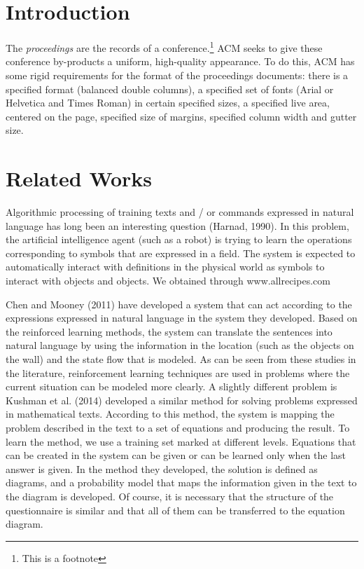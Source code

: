 \section{Introduction}

The \textit{proceedings} are the records of a conference.\footnote{This
  is a footnote}  ACM seeks
to give these conference by-products a uniform, high-quality
appearance.  To do this, ACM has some rigid requirements for the
format of the proceedings documents: there is a specified format
(balanced double columns), a specified set of fonts (Arial or
Helvetica and Times Roman) in certain specified sizes, a specified
live area, centered on the page, specified size of margins, specified
column width and gutter size.

\section{Related Works}
Algorithmic processing of training texts and / or commands expressed in natural language has long been an interesting question (Harnad, 1990). In this problem, the artificial intelligence agent (such as a robot) is trying to learn the operations corresponding to symbols that are expressed in a field. The system is expected to automatically interact with definitions in the physical world as symbols to interact with objects and objects. We obtained through www.allrecipes.com

Chen and Mooney (2011) have developed a system that can act according to the expressions expressed in natural language in the system they developed. Based on the reinforced learning methods, the system can translate the sentences into natural language by using the information in the location (such as the objects on the wall) and the state flow that is modeled. As can be seen from these studies in the literature, reinforcement learning techniques are used in problems where the current situation can be modeled more clearly.
A slightly different problem is Kushman et al. (2014) developed a similar method for solving problems expressed in mathematical texts. According to this method, the system is mapping the problem described in the text to a set of equations and producing the result. To learn the method, we use a training set marked at different levels. Equations that can be created in the system can be given or can be learned only when the last answer is given. In the method they developed, the solution is defined as diagrams, and a probability model that maps the information given in the text to the diagram is developed. Of course, it is necessary that the structure of the questionnaire is similar and that all of them can be transferred to the equation diagram.


